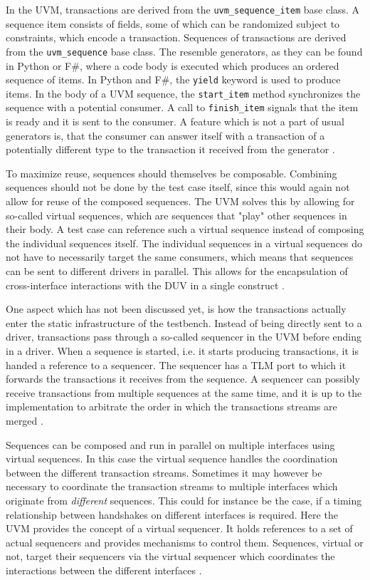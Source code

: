 \documentclass[11pt,a4paper]{report}
\newcommand{\ttt}{\texttt}
\begin{document}
In the UVM, transactions are derived from the \texttt{uvm\_sequence\_item} base class. A sequence item consists of
fields, some of which can be randomized subject to constraints, which encode a transaction. Sequences of transactions
are derived from the \ttt{uvm\_sequence} base class. The resemble generators, as they can be found in Python or F\#,
where a code body is executed which produces an ordered sequence of items. In Python and F\#, the \ttt{yield} keyword
is used to produce items. In the body of a UVM sequence, the \ttt{start\_item} method synchronizes the sequence with
a potential consumer. A call to \ttt{finish\_item} signals that the item is ready and it is sent to the consumer. A
feature which is not a part of usual generators is, that the consumer can answer itself with a transaction of a
potentially different type to the transaction it received from the generator \cite[Ch. 4.3]{mehta2018asic}.

To maximize reuse, sequences should themselves be composable. Combining sequences should not be done by the test case
itself, since this would again not allow for reuse of the composed sequences. The UVM solves this by allowing for
so-called virtual sequences, which are sequences that "play" other sequences in their body. A test case can reference
such a virtual sequence instead of composing the individual sequences itself. The individual sequences in a virtual
sequences do not have to necessarily target the same consumers, which means that sequences can be sent to different
drivers in parallel. This allows for the encapsulation of cross-interface interactions with the DUV in a single
construct \cite[Ch. 23]{salemi2013uvm}.

One aspect which has not been discussed yet, is how the transactions actually enter the static infrastructure of the
testbench. Instead of being directly sent to a driver, transactions pass through a so-called sequencer in the UVM
before ending in a driver. When a sequence is started, i.e. it starts producing transactions, it is handed a
reference to a sequencer. The sequencer has a TLM port to which it forwards the transactions it receives from the
sequence. A sequencer can possibly receive transactions from multiple sequences at the same time, and it is up to the
implementation to arbitrate the order in which the transactions streams are merged \cite[Ch. 23]{salemi2013uvm}.

Sequences can be composed and run in parallel on multiple interfaces using virtual sequences. In this case the virtual sequence handles the coordination between the different transaction streams. Sometimes it may however be necessary to coordinate the transaction streams to multiple interfaces which originate from \textit{different} sequences. This could for instance be the case, if a timing relationship between handshakes on different interfaces is required. Here the UVM provides the concept of a virtual sequencer. It holds references to a set of actual sequencers and provides mechanisms to control them. Sequences, virtual or not, target their sequencers via the virtual sequencer which coordinates the interactions between the different interfaces \cite{virtualseq}.  
\end{document}
